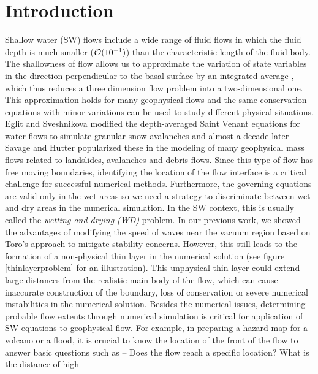\documentclass[review]{elsarticle}
\begin{document}
\linenumbers

\section{Introduction} 
\label{introduction}
Shallow water (SW) flows include a wide range of fluid flows in which the fluid depth is much 
smaller (${\cal O}(10^{-1})$) than the characteristic length of the fluid body. The shallowness of flow allows us to approximate the variation of state variables in the direction perpendicular to the basal surface by an integrated average \cite{SavageHutter}, which thus
reduces a three dimension flow problem into a two-dimensional one.
This approximation holds for many geophysical flows and the same 
conservation equations with  minor variations can be used to study different physical situations.
Eglit and Sveshnikova \cite{eglit1980mms} modified the depth-averaged Saint Venant equations for water flows to simulate granular snow avalanches and almost a decade later 
Savage and Hutter \cite{SavageHutter} popularized these in the modeling of many geophysical mass flows related to landslides, avalanches and debris flows. 
Since this type of flow has free moving boundaries, identifying the location of the flow interface is a critical challenge for successful numerical methods. 
Furthermore, the governing equations are valid only in the wet areas so we need a strategy to discriminate between wet and dry areas in the numerical simulation. 
In the SW context, this is usually called the {\it wetting and drying (WD)} problem. %
In our previous work\cite{Patra2005}, we showed the advantages of modifying the speed of waves near the vacuum region based on Toro's approach \cite{ToroBook2001}   to mitigate stability concerns. However, this still leads to the formation of a non-physical thin layer in the numerical solution (see figure \ref{thinlayerproblem} for an illustration).
This unphysical thin layer could extend large distances from the realistic main 
body of the flow, which can cause inaccurate construction of the boundary, loss of conservation or severe 
numerical instabilities in the numerical solution. 
Besides the numerical issues, determining probable flow extents through numerical simulation is critical for application of SW equations to 
geophysical flow. For example, in preparing a hazard map 
for a volcano or a flood, it is crucial to know the location of the front of the flow to answer basic questions such as --  Does the flow reach a specific location? What is the distance of high 
\end{document}
